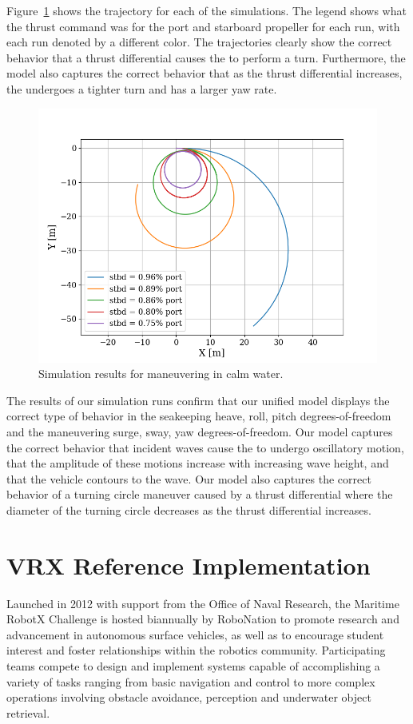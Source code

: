 \documentclass[utf8]{frontiersSCNS} %
\begin{document}
Figure~\ref{f:manuevering} shows the \wamv{} trajectory for each of the simulations. The legend shows what the thrust command was for the port and starboard propeller for each run, with each run denoted by a different color. The trajectories clearly show the correct behavior that a thrust differential causes the \wamv{} to perform a turn. Furthermore, the model also captures the correct behavior that as the thrust differential increases, the \wamv{} undergoes a tighter turn and has a larger yaw rate.
\begin{figure}[h]
  \centering
  \includegraphics[width=\SFc\textwidth]{src/2020_08_25_manuevering_000.png}
  \caption{Simulation results for maneuvering in calm water.}
  \label{f:manuevering}
\end{figure}

The results of our simulation runs confirm that our unified model displays the correct type of behavior in the seakeeping heave, roll, pitch degrees-of-freedom and the maneuvering surge, sway, yaw degrees-of-freedom. Our model captures the correct behavior that incident waves cause the \wamv{} to undergo oscillatory motion, that the amplitude of these motions increase with increasing wave height, and that the vehicle contours to the wave. Our model also captures the correct behavior of a turning circle maneuver caused by a thrust differential where the diameter of the turning circle decreases as the thrust differential increases.\color{black}
%
\section{VRX Reference Implementation}
%
Launched in 2012 with support from the Office of Naval Research, the Maritime RobotX Challenge is hosted biannually by RoboNation to promote research and advancement in autonomous surface vehicles, as well as to encourage student interest and foster relationships within the robotics community. Participating teams compete to design and implement systems capable of accomplishing a variety of tasks ranging from basic navigation and control to more complex operations involving obstacle avoidance, perception and underwater object retrieval.
\end{document}
